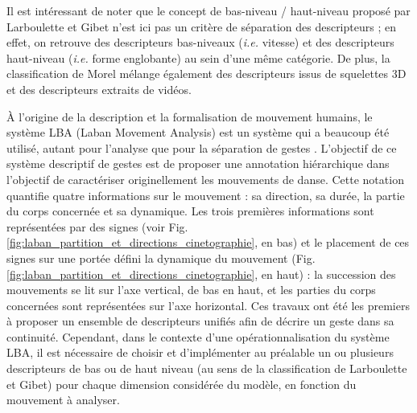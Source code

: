 Il est intéressant de noter que le concept de bas-niveau / haut-niveau proposé par Larboulette et Gibet n'est ici pas un critère de séparation des descripteurs ; en effet, on retrouve des descripteurs bas-niveaux (\textit{i.e.} vitesse) et des descripteurs haut-niveau (\textit{i.e.} forme englobante) au sein d'une même catégorie. De plus, la classification de Morel mélange également des descripteurs issus de squelettes 3D et des descripteurs extraits de vidéos.

À l'origine de la description et la formalisation de mouvement humains, le système LBA (Laban Movement Analysis) est un système qui a beaucoup été utilisé, autant pour l'analyse que pour la séparation de gestes \parencite{Bouchard2007SSo}. L'objectif de ce système descriptif de gestes est de proposer une annotation hiérarchique dans l'objectif de caractériser originellement les mouvements de danse. Cette notation quantifie quatre informations sur le mouvement : sa direction, sa durée, la partie du corps concernée et sa dynamique. Les trois premières informations sont représentées par des signes (voir Fig. \ref{fig:laban_partition_et_directions_cinetographie}, en bas) et le placement de ces signes sur une portée défini la dynamique du mouvement (Fig. \ref{fig:laban_partition_et_directions_cinetographie}, en haut) : la succession des mouvements se lit sur l'axe vertical, de bas en haut, et les parties du corps concernées sont représentées sur l'axe horizontal. Ces travaux ont été les premiers à proposer un ensemble de descripteurs unifiés afin de décrire un geste dans sa continuité. Cependant, dans le contexte d'une opérationnalisation du système LBA, il est nécessaire de choisir et d'implémenter au préalable un ou plusieurs descripteurs de bas ou de haut niveau (au sens de la classification de Larboulette et Gibet) pour chaque dimension considérée du modèle, en fonction du mouvement à analyser.


